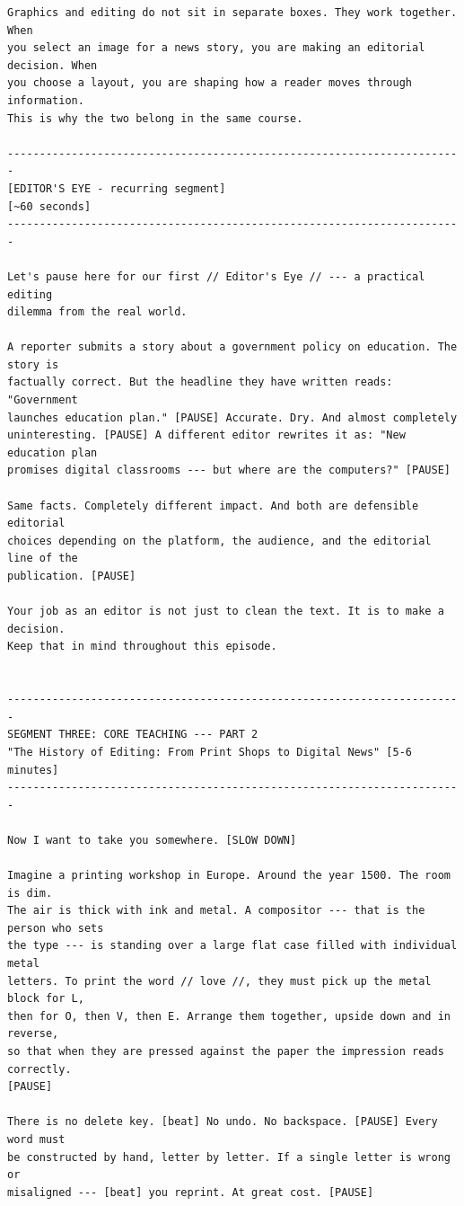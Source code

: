 {\begin{Verbatim}
Graphics and editing do not sit in separate boxes. They work together. When
you select an image for a news story, you are making an editorial decision. When
you choose a layout, you are shaping how a reader moves through information.
This is why the two belong in the same course.

-----------------------------------------------------------------------
[EDITOR'S EYE - recurring segment]
[~60 seconds]
-----------------------------------------------------------------------

Let's pause here for our first // Editor's Eye // --- a practical editing
dilemma from the real world.

A reporter submits a story about a government policy on education. The story is
factually correct. But the headline they have written reads: "Government
launches education plan." [PAUSE] Accurate. Dry. And almost completely
uninteresting. [PAUSE] A different editor rewrites it as: "New education plan
promises digital classrooms --- but where are the computers?" [PAUSE]

Same facts. Completely different impact. And both are defensible editorial
choices depending on the platform, the audience, and the editorial line of the
publication. [PAUSE]

Your job as an editor is not just to clean the text. It is to make a decision.
Keep that in mind throughout this episode.


-----------------------------------------------------------------------
SEGMENT THREE: CORE TEACHING --- PART 2
"The History of Editing: From Print Shops to Digital News" [5-6 minutes]
-----------------------------------------------------------------------

Now I want to take you somewhere. [SLOW DOWN]

Imagine a printing workshop in Europe. Around the year 1500. The room is dim.
The air is thick with ink and metal. A compositor --- that is the person who sets
the type --- is standing over a large flat case filled with individual metal
letters. To print the word // love //, they must pick up the metal block for L,
then for O, then V, then E. Arrange them together, upside down and in reverse,
so that when they are pressed against the paper the impression reads correctly.
[PAUSE]

There is no delete key. [beat] No undo. No backspace. [PAUSE] Every word must
be constructed by hand, letter by letter. If a single letter is wrong or
misaligned --- [beat] you reprint. At great cost. [PAUSE]


\end{Verbatim}}
